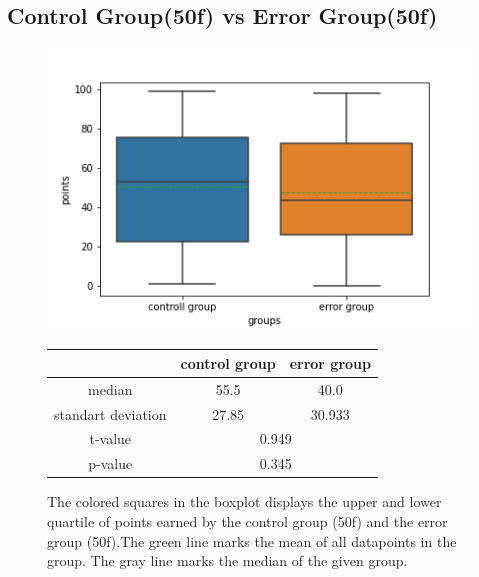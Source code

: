 \documentclass[runningheads]{llncs}
\begin{document}
\subsection{Control Group(50f) vs Error Group(50f)}
\begin{figure}[!ht]
    \begin{minipage}{0.4\textwidth}        
        \includegraphics[width=\textwidth]{code/generate/all.png}
        \caption{The colored squares in the boxplot displays
        the upper and lower quartile of points earned by the control group (50f) and
        the error group (50f).The green line marks the mean of all datapoints in the group.
        The gray line marks the median  of the given group.} \label{fig3}
    \end{minipage}
\hfill
\begin{minipage}{0.4\textwidth}
\begin{tabular}[]{| c | c | c |}
        \hline
        & control group & error group \\
        \hline
        median & 55.5&40.0 \\
        \hline
        standart deviation & 27.85&30.933 \\
        \hline
        t-value & \multicolumn{2}{c|}{0.949} \\
        \hline
        p-value & \multicolumn{2}{c|}{0.345} \\
        \hline            
\end{tabular}
\end{minipage}
\end{figure}
\end{document}
